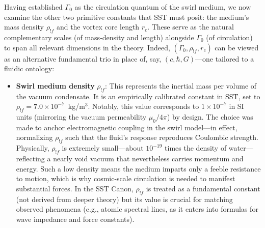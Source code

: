 \documentclass[11pt]{article}
\begin{document}
    Having established $\Gamma_0$ as the circulation quantum of the swirl medium, we now examine the other two primitive constants that SST must posit: the medium’s mass density $\rho_{!f}$ and the vortex core length $r_c$. These serve as the natural complementary scales (of mass-density and length) alongside $\Gamma_0$ (of circulation) to span all relevant dimensions in the theory. Indeed, $(\Gamma_0, \rho_{!f}, r_c)$ can be viewed as an alternative fundamental trio in place of, say, $(c, \hbar, G)$—one tailored to a fluidic ontology:
\begin{itemize}
        \item \textbf{Swirl medium density} $\rho_{!f}$: This represents the inertial mass per volume of the vacuum condensate. It is an empirically calibrated constant in SST, set to $\rho_{!f}=7.0\times10^{-7}$~kg/m$^3$. Notably, this value corresponds to $1\times10^{-7}$ in SI units (mirroring the vacuum permeability $\mu_0/4\pi$) by design. The choice was made to anchor electromagnetic coupling in the swirl model—in effect, normalizing $\rho_{!f}$ such that the fluid’s response reproduces Coulombic strength. Physically, $\rho_{!f}$ is extremely small—about $10^{-19}$ times the density of water—reflecting a nearly void vacuum that nevertheless carries momentum and energy. Such a low density means the medium imparts only a feeble resistance to motion, which is why cosmic-scale circulation is needed to manifest substantial forces. In the SST Canon, $\rho_{!f}$ is treated as a fundamental constant (not derived from deeper theory) but its value is crucial for matching observed phenomena (e.g., atomic spectral lines, as it enters into formulas for wave impedance and force constants).

\end{itemize}
\end{document}
